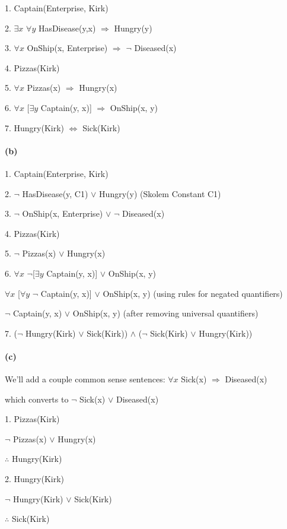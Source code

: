 \documentclass[11pt,a4paper]{article}
\begin{document}
1. Captain(Enterprise, Kirk)

2. $\exists x$ $\forall y$ HasDisease(y,x) $\Rightarrow$ Hungry(y)

3. $\forall x$ OnShip(x, Enterprise) $\Rightarrow$ $\neg$ Diseased(x)

4. Pizzas(Kirk)

5. $\forall x$ Pizzas(x) $\Rightarrow$ Hungry(x)

6. $\forall x$ [$\exists y$ Captain(y, x)] $\Rightarrow$ OnShip(x, y)

7. Hungry(Kirk) $\Leftrightarrow$ Sick(Kirk)

\paragraph*{(b)}

1. Captain(Enterprise, Kirk)

2. $\neg$ HasDisease(y, C1) $\vee$ Hungry(y)     (Skolem Constant C1)

3. $\neg$ OnShip(x, Enterprise) $\vee$ $\neg$ Diseased(x)

4. Pizzas(Kirk)

5. $\neg$ Pizzas(x) $\vee$ Hungry(x)

6. $\forall x$ $\neg$[$\exists y$ Captain(y, x)] $\vee$ OnShip(x, y)

$\forall x$ [$\forall y$ $\neg$ Captain(y, x)] $\vee$ OnShip(x, y)  \qquad(using rules for negated quantifiers)

$\neg$ Captain(y, x) $\vee$ OnShip(x, y)        \qquad(after removing universal quantifiers)

7. ($\neg$ Hungry(Kirk) $\vee$ Sick(Kirk)) $\wedge$ ($\neg$ Sick(Kirk) $\vee$ Hungry(Kirk))

\paragraph*{(c)}
We'll add a couple common sense sentences:
$\forall x$ Sick(x) $\Rightarrow$ Diseased(x)

which converts to $\neg$ Sick(x) $\vee$ Diseased(x)

1. Pizzas(Kirk)

$\neg$ Pizzas(x) $\vee$ Hungry(x)

$\therefore$ Hungry(Kirk)
\newline

2. Hungry(Kirk)

$\neg$ Hungry(Kirk) $\vee$ Sick(Kirk)

$\therefore$ Sick(Kirk)
\newline
\end{document}
